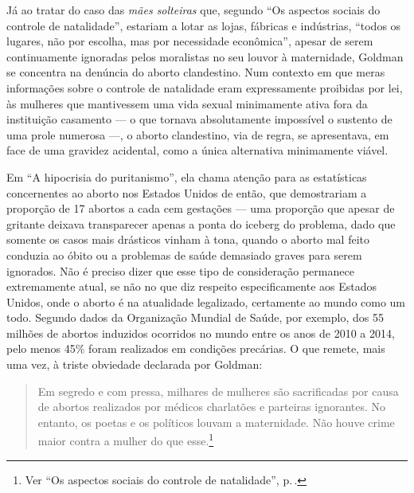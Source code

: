 Já ao
tratar do caso das \textit{mães solteiras} que, segundo ``Os aspectos sociais
do controle de natalidade'', estariam a lotar as lojas, fábricas e
indústrias, ``todos os lugares, não por escolha, mas por
necessidade econômica'', apesar de serem continuamente ignoradas pelos
moralistas no seu louvor à maternidade, Goldman se concentra na denúncia
do aborto clandestino. Num contexto em que meras informações sobre o
controle de natalidade eram expressamente proibidas por lei, às mulheres
que mantivessem uma vida sexual minimamente ativa fora da instituição
casamento --- o que tornava absolutamente impossível o sustento de uma
prole numerosa ---, o aborto clandestino, via de regra, se apresentava,
em face de uma gravidez acidental, como a única alternativa minimamente
viável.

Em ``A hipocrisia do puritanismo'', ela chama atenção para as
estatísticas concernentes ao aborto nos Estados Unidos de então, que
demostrariam a proporção de 17 abortos a cada cem gestações --- uma
proporção que apesar de gritante deixava transparecer apenas a ponta do
iceberg do problema, dado que somente os casos mais drásticos vinham à
tona, quando o aborto mal feito conduzia ao óbito ou a problemas de
saúde demasiado graves para serem ignorados. Não é preciso dizer que
esse tipo de consideração permanece extremamente atual, se não no que
diz respeito especificamente aos Estados Unidos, onde o aborto é na
atualidade legalizado, certamente ao mundo como um todo. Segundo dados
da Organização Mundial de Saúde, por exemplo, dos 55 milhões de abortos
induzidos ocorridos no mundo entre os anos de 2010 a 2014, pelo menos
45\% foram realizados em condições precárias. O que remete, mais uma
vez, à triste obviedade declarada por Goldman:

\begin{quote}
Em segredo e com pressa, milhares de
mulheres são sacrificadas por causa de abortos realizados por médicos
charlatões e parteiras ignorantes. No entanto, os poetas e os políticos
louvam a maternidade. Não houve crime maior contra a mulher do que esse.\footnote{Ver ``Os aspectos sociais do controle de natalidade'', p.\,\pageref{aborto}.}
\end{quote}

